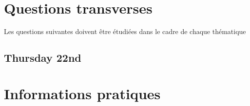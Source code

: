 \documentclass[openany, parskip=full, 12pt, a4]{scrbook}
\begin{document}
\chapter{Questions transverses}

Les questions suivantes doivent être étudiées dans le cadre de chaque thématique

\begin{description}



\end{description}

\section{Thursday 22nd}

\chapter{Informations pratiques}




\newpage


\pagecolor{eventD}
\thispagestyle{empty}
\mbox{}
\end{document}
